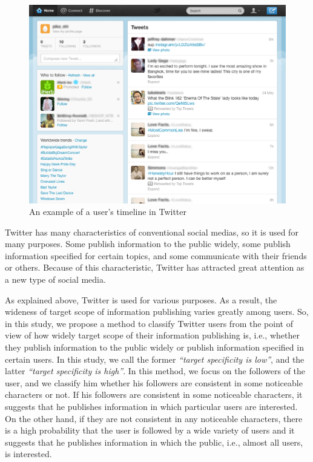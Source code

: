 {\footnotesize
\begin{figure}[t]
\begin{center}
\includegraphics[width=14cm]{images/screen_shot.eps}
 \caption{An example of a user's timeline in Twitter}
\label{fig:twitter}
\end{center}
\end{figure}
}

Twitter has many characteristics of conventional social medias, so it is
used for many purposes.  Some publish information to the public widely,
some publish information specified for certain topics, and some
communicate with their friends or others.  Because of this
characteristic, Twitter has attracted great attention as a new type of
social media.

As explained above, Twitter is used for various purposes.  As a result,
the wideness of target scope of information publishing varies greatly
among users.  So, in this study, we propose a method to classify
Twitter users from the point of view of how widely target scope of
their information publishing is, i.e., whether they publish information
to the public widely or publish information specified in certain users.
In this study, we call the former \emph{``target specificity is
low''}, and the latter \emph{``target specificity is high''}. In this
method, we
focus on the followers of the user, and we classify him
whether his followers are consistent in some noticeable characters
or not.  If his followers are consistent in some noticeable
characters, it suggests that he publishes information in which
particular users are interested. On the other hand, if they are not
consistent in any noticeable characters, there is a high
probability that the user is followed by a wide variety of users and it
suggests that he publishes information in which the public, i.e.,
almost all users, is interested.

